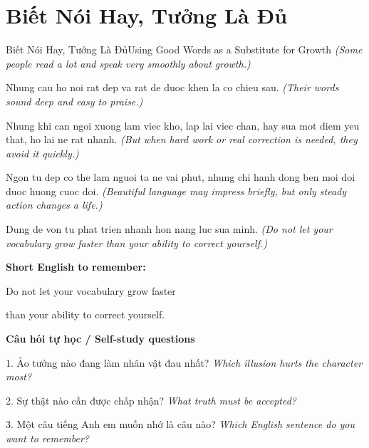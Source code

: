 \section{Biết Nói Hay, Tưởng Là Đủ}
\begin{truyen}{Biết Nói Hay, Tưởng Là Đủ}{Using Good Words as a Substitute for Growth}
\textit{(Some people read a lot and speak very smoothly about growth.)}

Nhung cau ho noi rat dep va rat de duoc khen la co chieu sau.
\textit{(Their words sound deep and easy to praise.)}

Nhung khi can ngoi xuong lam viec kho, lap lai viec chan, hay sua mot diem yeu that, ho lai ne rat nhanh.
\textit{(But when hard work or real correction is needed, they avoid it quickly.)}

Ngon tu dep co the lam nguoi ta ne vai phut, nhung chi hanh dong ben moi doi duoc huong cuoc doi.
\textit{(Beautiful language may impress briefly, but only steady action changes a life.)}

\end{truyen}

\begin{baihoc}
Dung de von tu phat trien nhanh hon nang luc sua minh.
\textit{(Do not let your vocabulary grow faster than your ability to correct yourself.)}
\end{baihoc}

\begin{ghinhoanh}
\textbf{Short English to remember:}

Do not let your vocabulary grow faster

than your ability to correct yourself.

\end{ghinhoanh}

\begin{tuhocnhanh}
\textbf{Câu hỏi tự học / Self-study questions}

1. Ảo tưởng nào đang làm nhân vật đau nhất? \textit{Which illusion hurts the character most?}

2. Sự thật nào cần được chấp nhận? \textit{What truth must be accepted?}

3. Một câu tiếng Anh em muốn nhớ là câu nào? \textit{Which English sentence do you want to remember?}
\end{tuhocnhanh}
\ngancach

